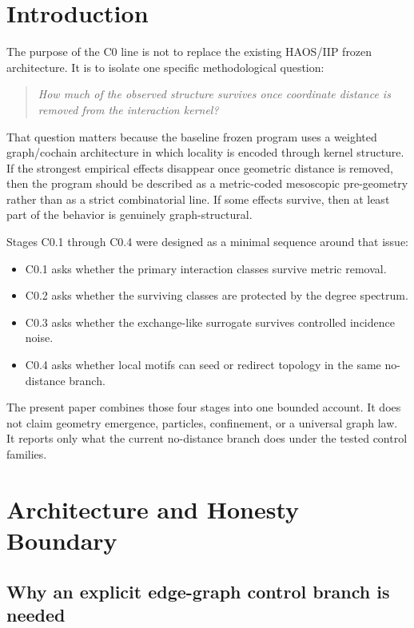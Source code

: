 \documentclass[11pt]{article}
\begin{document}
\section{Introduction}

The purpose of the C0 line is not to replace the existing HAOS/IIP frozen architecture. It is to isolate one specific methodological question:
\begin{quote}
\emph{How much of the observed structure survives once coordinate distance is removed from the interaction kernel?}
\end{quote}

That question matters because the baseline frozen program uses a weighted graph/cochain architecture in which locality is encoded through kernel structure. If the strongest empirical effects disappear once geometric distance is removed, then the program should be described as a metric-coded mesoscopic pre-geometry rather than as a strict combinatorial line. If some effects survive, then at least part of the behavior is genuinely graph-structural.

Stages C0.1 through C0.4 were designed as a minimal sequence around that issue:
\begin{itemize}
\item C0.1 asks whether the primary interaction classes survive metric removal.
\item C0.2 asks whether the surviving classes are protected by the degree spectrum.
\item C0.3 asks whether the exchange-like surrogate survives controlled incidence noise.
\item C0.4 asks whether local motifs can seed or redirect topology in the same no-distance branch.
\end{itemize}

The present paper combines those four stages into one bounded account. It does not claim geometry emergence, particles, confinement, or a universal graph law. It reports only what the current no-distance branch does under the tested control families.

\section{Architecture and Honesty Boundary}

\subsection{Why an explicit edge-graph control branch is needed}
\end{document}
